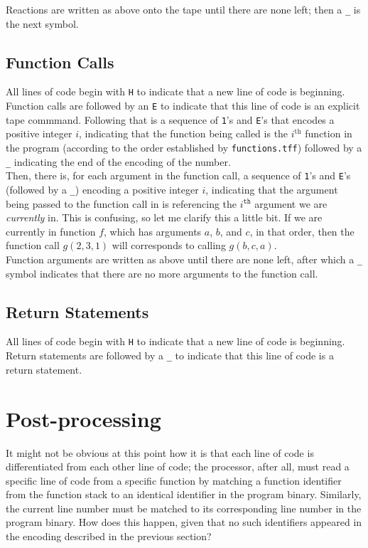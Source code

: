 \documentclass[11pt]{article}
\begin{document}
Reactions are written as above onto the tape until there are none left; then a \texttt{_} is the next symbol.

\subsection{Function Calls}

All lines of code begin with \texttt{H} to indicate that a new line of code is beginning. Function calls are followed by an \texttt{E} to indicate that this line of code is an explicit tape commmand. Following that is a sequence of \texttt{1}'s and \texttt{E}'s that encodes a positive integer $i$, indicating that the function being called is the $i^\textrm{th}$ function in the program (according to the order established by \texttt{functions.tff}) followed by a \texttt{_} indicating the end of the encoding of the number. \\

Then, there is, for each argument in the function call, a sequence of \texttt{1}'s and \texttt{E}'s (followed by a \texttt{_}) encoding a positive integer $i$, indicating that the argument being passed to the function call in is referencing the $i^\texttt{th}$ argument we are \emph{currently} in. This is confusing, so let me clarify this a little bit. If we are currently in function $f$, which has arguments $a$, $b$, and $c$, in that order, then the function call $g(2,3,1)$ will corresponds to calling $g(b,c,a)$. \\

Function arguments are written as above until there are none left, after which a \texttt{_} symbol indicates that there are no more arguments to the function call.

\subsection{Return Statements}

All lines of code begin with \texttt{H} to indicate that a new line of code is beginning. Return statements are followed by a \texttt{_} to indicate that this line of code is a return statement.

\section{Post-processing}

It might not be obvious at this point how it is that each line of code is differentiated from each other line of code; the processor, after all, must read a specific line of code from a specific function by matching a function identifier from the function stack to an identical identifier in the program binary. Similarly, the current line number must be matched to its corresponding line number in the program binary. How does this happen, given that no such identifiers appeared in the encoding described in the previous section? \\
\end{document}
